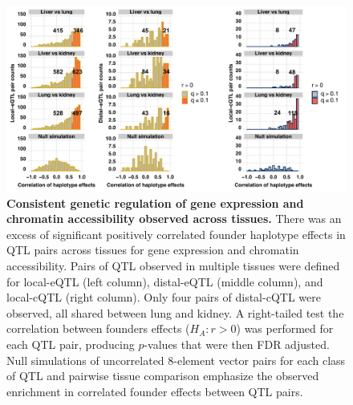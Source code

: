 \documentclass[10pt,letterpaper,twoside]{article}
\begin{document}
\begin{figure}[hp]
\renewcommand{\familydefault}{\sfdefault}\normalfont
\centering
\includegraphics[width=\textwidth, trim={0in 0in 0in 0in}, clip]{figs/qtl_pair_cor_histograms.pdf}
\caption{\textbf{Consistent genetic regulation of gene expression and chromatin accessibility observed across tissues.} 
There was an excess of significant positively correlated founder haplotype effects in QTL pairs across tissues for gene expression and chromatin accessibility. Pairs of QTL observed in multiple tissues were defined for local-eQTL (left column), distal-eQTL (middle column), and local-cQTL (right column). Only four pairs of distal-cQTL were observed, all shared between lung and kidney. A right-tailed test the correlation between founders effects ($H_{A}: r > 0$) was performed for each QTL pair, producing $p$-values that were then FDR adjusted. Null simulations of uncorrelated 8-element vector pairs for each class of QTL and pairwise tissue comparison emphasize the observed enrichment in correlated founder effects between QTL pairs.  
\label{fig:qtl_pair_histograms}}
\end{figure}

\clearpage
\end{document}
